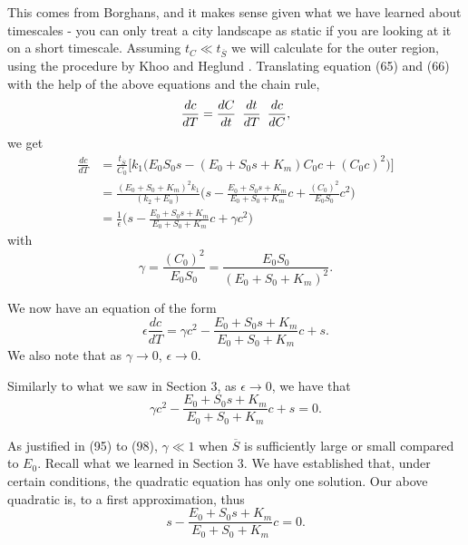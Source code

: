 \documentclass[12pt]{article}
\begin{document}
This comes from Borghans, and it makes sense given what we have
learned about timescales - you can only treat a city landscape as
static if you are looking at it on a short timescale. Assuming
$t_C \ll t_{\overline{S}}$ we will calculate for the outer region,
using the procedure by Khoo and Heglund
\cite{khoo2008total}. Translating equation (65) and (66) with the help
of the above equations and the chain rule,
\begin{equation}
\frac{dc}{dT} = \frac{dC}{dt} \enskip \frac{dt}{dT} \enskip \frac{dc}{dC},
\end{equation}
we get
\begin{align}
\frac{dc}{dT} &= \frac{t_{\overline{S}}}{C_0}
       \Big[k_1 \Big(E_0 S_0 s - (E_0 + S_0 s + K_m) C_0 c + (C_0 c)^2
                   \Big)\Big] \\
              &= \frac{(E_0+S_0+K_m)^2 k_1}{(k_2 + E_0)}
                 \Big(s - \frac{E_0+S_0 s+K_m}{E_0 + S_0 + K_m} c
                        + \frac{(C_0)^2}{E_0 S_0} c^2 \Big) \\
              &= \frac{1}{\epsilon}
                 \Big(s - \frac{E_0+S_0 s+K_m}{E_0 + S_0 + K_m} c
                        +  \gamma c^2 \Big)
\end{align}
with
\begin{equation}
\gamma = \frac{(C_0)^2}{E_0 S_0} = \frac{E_0 S_0}{(E_0 + S_0 + K_m)^2}.
\end{equation}

We now have an equation of the form
\begin{equation}
  \epsilon \frac{dc}{dT} = \gamma c^2 - \frac{E_0+S_0 s+K_m}{E_0 + S_0 + K_m} c+ s.
\end{equation}
We also note that as $\gamma \to 0$, $\epsilon \to 0$.

Similarly to what we saw in Section 3, as $\epsilon \to 0$, we have that
\begin{equation}
   \gamma c^2  - \frac{E_0+S_0 s+K_m}{E_0 + S_0 + K_m} c + s = 0.
\end{equation}

As justified in (95) to (98), $\gamma \ll 1$ when $\overline{S}$ is
sufficiently large or small compared to $E_0$. Recall what we learned
in Section 3. We have established that, under certain conditions, the
quadratic equation has only one solution. Our above quadratic is, to a
first approximation, thus
\begin{equation}
  s - \frac{E_0+S_0 s+K_m}{E_0 + S_0 + K_m} c = 0.
\end{equation}
\end{document}
